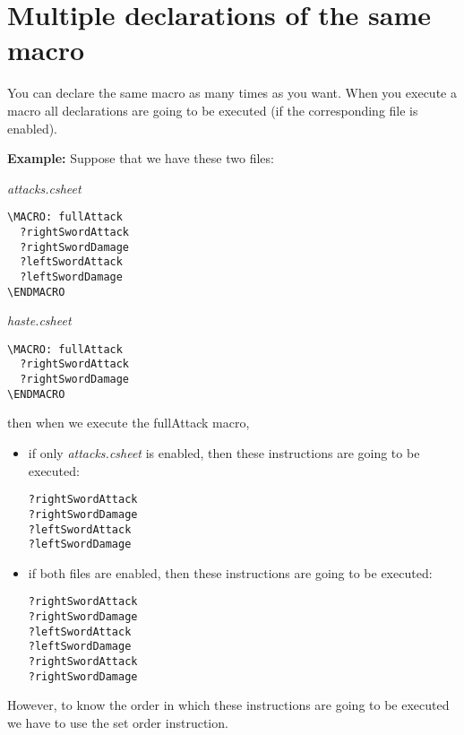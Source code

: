 \documentclass[11pt,a4paper,openright,oneside]{book}
\newenvironment{ex}
{
  \setlength{\parindent}{0cm}
  \large \textbf{Example:} \normalsize 
}
{}
\begin{document}
\section{Multiple declarations of the same macro}

You can declare the same macro as many times as you want. When you execute a macro all declarations are going to be executed (if the corresponding file is enabled).

\begin{ex} Suppose that we have these two files: 

\hrulefill

\begin{center}\textit{attacks.csheet} \end{center}
  \begin{lstlisting}
\MACRO: fullAttack
  ?rightSwordAttack
  ?rightSwordDamage
  ?leftSwordAttack
  ?leftSwordDamage
\ENDMACRO
  \end{lstlisting}  

\hrulefill

\begin{center} \textit{haste.csheet} \end{center}
  \begin{lstlisting}
\MACRO: fullAttack
  ?rightSwordAttack
  ?rightSwordDamage
\ENDMACRO
  \end{lstlisting}  

\hrulefill

then when we execute the \textsf{fullAttack} macro, 
\begin{itemize}
  \item if only \textit{attacks.csheet} is enabled, then these instructions are going to be executed:
    \begin{lstlisting}
?rightSwordAttack
?rightSwordDamage
?leftSwordAttack
?leftSwordDamage
    \end{lstlisting}
  \item if both files are enabled, then these instructions are going to be executed:
    \begin{lstlisting}
?rightSwordAttack
?rightSwordDamage
?leftSwordAttack
?leftSwordDamage
?rightSwordAttack
?rightSwordDamage
    \end{lstlisting}
\end{itemize}

\end{ex}

However, to know the order in which these instructions are going to be executed we have to use the \textsf{set order} instruction.
\end{document}
